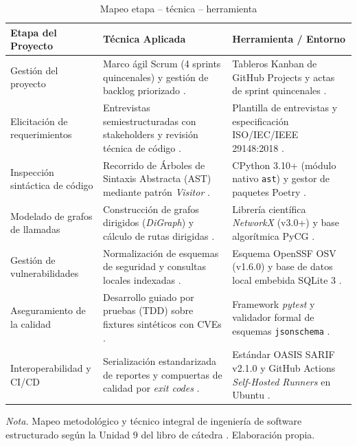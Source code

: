 \begin{table}[H]
\centering
\caption{Mapeo etapa -- técnica -- herramienta}
\label{tab:mapeo_herramientas}
\small
{}
\begin{tabularx}{\textwidth}{>{\raggedright\arraybackslash}p{4.2cm} >{\raggedright\arraybackslash}p{5.5cm} X}
\toprule
\textbf{Etapa del Proyecto} & \textbf{Técnica Aplicada} & \textbf{Herramienta / Entorno} \\
\midrule
Gestión del proyecto & 
Marco ágil Scrum (4 sprints quincenales) y gestión de backlog priorizado \parencite{pmi2021pmbok}. & 
Tableros Kanban de GitHub Projects y actas de sprint quincenales \parencite{torres2026proyecto}. \\ %
\addlinespace
Elicitación de requerimientos & 
Entrevistas semiestructuradas con stakeholders y revisión técnica de código \parencite{kendall2019systems}. & 
Plantilla de entrevistas y especificación ISO/IEC/IEEE 29148:2018 \parencite{iso2018req}. \\ %
\addlinespace
Inspección sintáctica de código & 
Recorrido de Árboles de Sintaxis Abstracta (AST) mediante patrón \textit{Visitor} \parencite{salis2021pycg}. & 
CPython 3.10+ (módulo nativo \texttt{ast}) y gestor de paquetes Poetry \parencite{salis2021pycg}. \\ %
\addlinespace
Modelado de grafos de llamadas & 
Construcción de grafos dirigidos (\textit{DiGraph}) y cálculo de rutas dirigidas \parencite{ryder1979constructing}. & 
Librería científica \textit{NetworkX} (v3.0+) y base algorítmica PyCG \parencite{hagberg2008exploring, salis2021pycg}. \\ %
\addlinespace
Gestión de vulnerabilidades & 
Normalización de esquemas de seguridad y consultas locales indexadas \parencite{openssf2023osv}. & 
Esquema OpenSSF OSV (v1.6.0) y base de datos local embebida SQLite 3 \parencite{openssf2023osv}. \\ %
\addlinespace
Aseguramiento de la calidad & 
Desarrollo guiado por pruebas (TDD) sobre fixtures sintéticos con CVEs \parencite{myers2011art}. & 
Framework \textit{pytest} y validador formal de esquemas \texttt{jsonschema} \parencite{oasis2019sarif}. \\ %
\addlinespace
Interoperabilidad y CI/CD & 
Serialización estandarizada de reportes y compuertas de calidad por \textit{exit codes} \parencite{oasis2019sarif}. & 
Estándar OASIS SARIF v2.1.0 y GitHub Actions \textit{Self-Hosted Runners} en Ubuntu \parencite{humble2010continuous}. \\ %
\bottomrule
\end{tabularx}
\vspace{2pt}
\begin{flushleft}
\scriptsize \textit{Nota.} Mapeo metodológico y técnico integral de ingeniería de software estructurado según la Unidad 9 del libro de cátedra \parencite{torres2026proyecto}. Elaboración propia. %
\end{flushleft}
\end{table}

